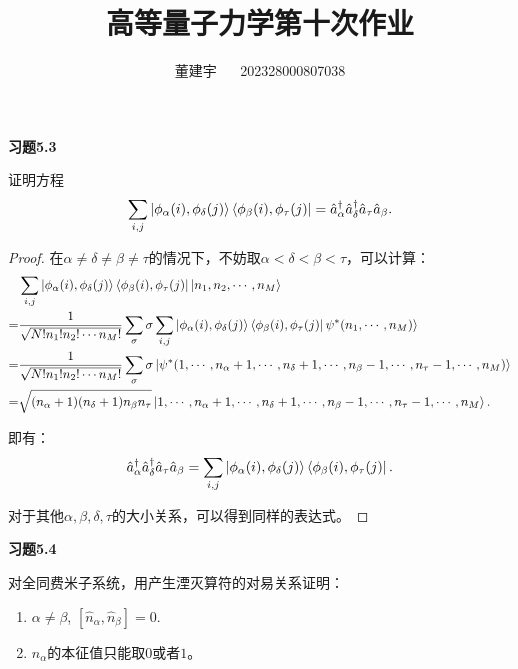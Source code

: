 \documentclass[reqno,a4paper,12pt]{amsart}
\title{高等量子力学第十次作业}
\author{董建宇 ~~ 202328000807038}
\begin{document}
\maketitle

\textbf{习题5.3}

证明方程
\[
	\sum_{i, j} \ket{\phi_\alpha(i), \phi_\delta(j)} \bra{\phi_\beta(i), \phi_\tau(j)} = \hat{a}^\dagger_\alpha \hat{a}^\dagger_\delta \hat{a}_\tau \hat{a}_\beta.
\]

\begin{proof}
在$\alpha \neq \delta \neq \beta \neq \tau$的情况下，不妨取$\alpha<\delta<\beta<\tau$，可以计算：
\begin{align*}
	&\sum_{i, j} \ket{\phi_\alpha(i), \phi_\delta(j)} \bra{\phi_\beta(i), \phi_\tau(j)} \ket{n_1, n_2, \cdots, n_M} \\
	=& \frac{1}{\sqrt{N!n_1!n_2!\cdots n_M!}} \sum_\sigma \sigma \sum_{i, j} \ket{\phi_\alpha(i), \phi_\delta(j)} \bra{\phi_\beta(i), \phi_\tau(j)} \psi^*(n_1, \cdots, n_M) \rangle \\
	=& \frac{1}{\sqrt{N!n_1!n_2!\cdots n_M!}} \sum_\sigma \sigma \ket{\psi^*(1, \cdots, n_\alpha+1, \cdots, n_\delta+1, \cdots, n_\beta-1, \cdots, n_\tau-1, \cdots, n_M)} \\
	=& \sqrt{(n_\alpha+1)(n_\delta+1)n_\beta n_\tau} \ket{1, \cdots, n_\alpha+1, \cdots, n_\delta+1, \cdots, n_\beta-1, \cdots, n_\tau-1, \cdots, n_M}.
\end{align*}

即有：
\[
	\hat{a}^\dagger_\alpha \hat{a}^\dagger_\delta \hat{a}_\tau \hat{a}_\beta = \sum_{i, j} \ket{\phi_\alpha(i), \phi_\delta(j)} \bra{\phi_\beta(i), \phi_\tau(j)}.
\]

对于其他$\alpha, \beta, \delta, \tau$的大小关系，可以得到同样的表达式。
\end{proof}

\medskip

\textbf{习题5.4}

对全同费米子系统，用产生湮灭算符的对易关系证明：
\begin{enumerate}
	\item $\alpha \neq \beta$, $[\hat{n}_\alpha, \hat{n}_\beta] = 0$.
	
	\item $\hat{n}_\alpha$的本征值只能取$0$或者$1$。
\end{enumerate}
\end{document}
